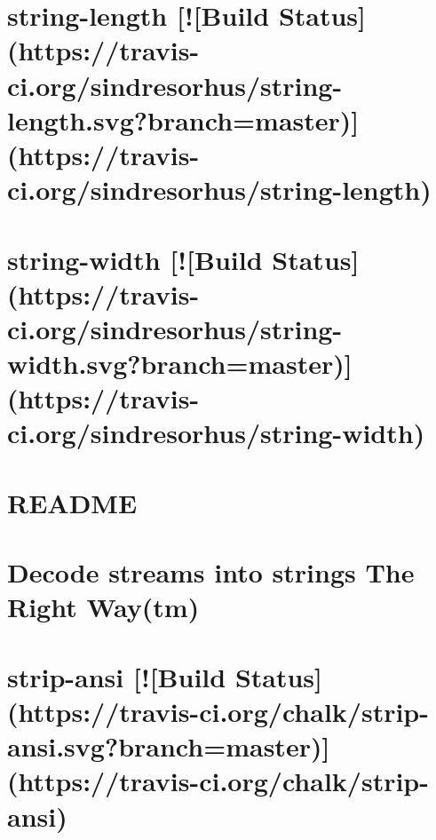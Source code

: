 \documentclass[twoside]{book}
\newcommand{\+}{\discretionary{\mbox{\scriptsize$\hookleftarrow$}}{}{}}
\begin{document}
\chapter{string-\/length \mbox{[}!\mbox{[}Build Status\mbox{]}(https\+://travis-\/ci.org/sindresorhus/string-\/length.svg?branch=master)\mbox{]}(https\+://travis-\/ci.org/sindresorhus/string-\/length)}
\label{md__c_1_workspace_demo_src_main_script_node_modules_string-length_readme}

\chapter{string-\/width \mbox{[}!\mbox{[}Build Status\mbox{]}(https\+://travis-\/ci.org/sindresorhus/string-\/width.svg?branch=master)\mbox{]}(https\+://travis-\/ci.org/sindresorhus/string-\/width)}
\label{md__c_1_workspace_demo_src_main_script_node_modules_string-width_readme}

\chapter{R\+E\+A\+D\+ME}
\label{md__c_1_workspace_demo_src_main_script_node_modules_string_decoder__r_e_a_d_m_e}

\chapter{Decode streams into strings The Right Way(tm)}
\label{md__c_1_workspace_demo_src_main_script_node_modules_stringstream__r_e_a_d_m_e}

\chapter{strip-\/ansi \mbox{[}!\mbox{[}Build Status\mbox{]}(https\+://travis-\/ci.org/chalk/strip-\/ansi.svg?branch=master)\mbox{]}(https\+://travis-\/ci.org/chalk/strip-\/ansi)}
\label{md__c_1_workspace_demo_src_main_script_node_modules_strip-ansi_readme}

\end{document}
